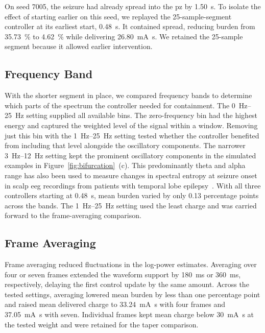 On seed 7005, the seizure had already spread into the \ac{pz} by \SI{1.50}{\second}.
To isolate the effect of starting earlier on this seed, we replayed the 25-sample-segment controller at its earliest start, \SI{0.48}{\second}.
It contained spread, reducing burden from \SI{35.73}{\percent} to \SI{4.62}{\percent} while delivering \SI{26.80}{\milli\ampere\second}.
We retained the 25-sample segment because it allowed earlier intervention.

\subsection{Frequency Band}

With the shorter segment in place, we compared frequency bands to determine which parts of the spectrum the controller needed for containment.
The \SIrange{0}{25}{\hertz} setting supplied all available bins.
The zero-frequency bin had the highest energy and captured the weighted level of the signal within a window.
Removing just this bin with the \SIrange{1}{25}{\hertz} setting tested whether the controller benefited from including that level alongside the oscillatory components.
The narrower \SIrange{3}{12}{\hertz} setting kept the prominent oscillatory components in the simulated examples in Figure~\ref{fig:bifurcation}~(c).
This predominantly theta and alpha range has also been used to measure changes in spectral entropy at seizure onset in scalp \ac{eeg} recordings from patients with temporal lobe epilepsy~\cite{Sridevi2019}.
With all three controllers starting at \SI{0.48}{\second}, mean burden varied by only 0.13 percentage points across the bands.
The \SIrange{1}{25}{\hertz} setting used the least charge and was carried forward to the frame-averaging comparison.

\subsection{Frame Averaging}

Frame averaging reduced fluctuations in the log-power estimates.
Averaging over four or seven frames extended the waveform support by \SI{180}{\milli\second} or \SI{360}{\milli\second}, respectively, delaying the first control update by the same amount.
Across the tested settings, averaging lowered mean burden by less than one percentage point and raised mean delivered charge to \SI{33.24}{\milli\ampere\second} with four frames and \SI{37.05}{\milli\ampere\second} with seven.
Individual frames kept mean charge below \SI{30}{\milli\ampere\second} at the tested weight and were retained for the taper comparison.

